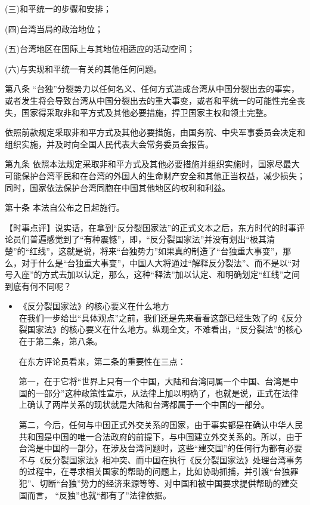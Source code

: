 \documentclass[a4paper,11pt]{article}
\begin{document}
\begin{itemize}
   (三)和平统一的步骤和安排；

   (四)台湾当局的政治地位；

   (五)台湾地区在国际上与其地位相适应的活动空间；

   (六)与实现和平统一有关的其他任何问题。

   第八条 “台独”分裂势力以任何名义、任何方式造成台湾从中国分裂出去的事实，或者发生将会导致台湾从中国分裂出去的重大事变，或者和平统一的可能性完全丧失，国家得采取非和平方式及其他必要措施，捍卫国家主权和领土完整。

   依照前款规定采取非和平方式及其他必要措施，由国务院、中央军事委员会决定和组织实施，并及时向全国人民代表大会常务委员会报告。

   第九条 依照本法规定采取非和平方式及其他必要措施并组织实施时，国家尽最大可能保护台湾平民和在台湾的外国人的生命财产安全和其他正当权益，减少损失；同时，国家依法保护台湾同胞在中国其他地区的权利和利益。

   第十条 本法自公布之日起施行。

   【时事点评】说实话，在拿到“反分裂国家法”的正式文本之后，东方时代的时事评论员们普遍感觉到了“有种震憾”，即，“反分裂国家法”并没有划出“极其清楚”的“红线”，这就是说，将来“台独势力”如果真的制造了“台独重大事变”，那么，对于什么是“台独重大事变”，中国人大将通过“解释反分裂法”、而不是以“对号入座”的方式去加以认定，那么，这种“释法”加以认定、和明确划定“红线”之间到底有何不同呢？

\begin{itemize}

\item 《反分裂国家法》的核心要义在什么地方\\
\label{sec-2_1_1}%
在我们一步给出“具体观点”之前，我们还是先来看看这部已经生效了的《反分裂国家法》的核心要义在什么地方。纵观全文，不难看出，“反分裂法”的核心在于第二条，第八条。

    在东方评论员看来，第二条的重要性在三点：

    第一，在于它将“世界上只有一个中国，大陆和台湾同属一个中国、台湾是中国的一部分”这种政策性宣示，从法律上加以明确了，也就是说，正式在法律上确认了两岸关系的现状就是大陆和台湾都属于一个中国的一部分。

    第二，今后，任何与中国正式外交关系的国家，由于事实都是在确认中华人民共和国是中国的唯一合法政府的前提下，与中国建立外交关系的。所以，由于台湾是中国的一部分，在涉及台湾问题时，这些“建交国”的任何行为都有必要不与《反分裂国家法》相冲突、而中国在执行《反分裂国家法》处理台湾事务的过程中，在寻求相关国家的帮助的问题上，比如协助抓捕，并引渡“台独罪犯”、切断“台独”势力的经济来源等等、对中国和被中国要求提供帮助的建交国而言， “反独”也就“都有了”法律依据。


\end{itemize}
\end{itemize}
\end{document}
